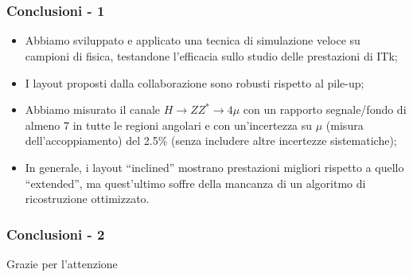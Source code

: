 \documentclass{beamer}
\begin{document}
\section{}
\begin{frame}
\frametitle{Conclusioni - 1}
\begin{itemize}
\item<1-> Abbiamo sviluppato e applicato una tecnica di simulazione veloce
su campioni di fisica, testandone l'efficacia sullo studio delle prestazioni di ITk;
\item<2-> I layout proposti dalla collaborazione sono robusti rispetto al pile-up;
\item<3-> Abbiamo misurato il canale $H \rightarrow ZZ^{*} \rightarrow 4\mu$ con
un rapporto segnale/fondo di almeno 7 in tutte le regioni angolari e con un'incertezza
su $\mu$ (misura dell'accoppiamento) del 2.5\% (senza includere altre incertezze sistematiche);
\item<4-> In generale, i layout ``inclined'' mostrano prestazioni migliori rispetto a quello
``extended'', ma quest'ultimo soffre della mancanza di un algoritmo di ricostruzione ottimizzato.
\end{itemize}
\end{frame}

\begin{frame}[label=Conclusions]
\frametitle{Conclusioni - 2}

\bigskip
\bigskip
\bigskip
{} {
\centering
\Large \color{dred} Grazie per l'attenzione
}

\end{frame}
\end{document}
